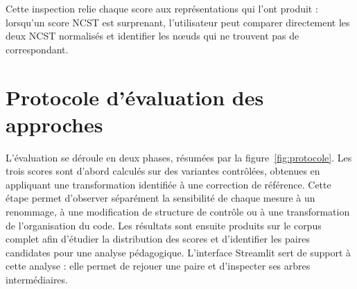 {Cette inspection relie chaque score aux représentations qui l'ont produit :
lorsqu'un score NCST est surprenant, l'utilisateur peut comparer directement
les deux NCST normalisés et identifier les nœuds qui ne trouvent pas de
correspondant.

\section{Protocole d'évaluation des approches}

L'évaluation se déroule en deux phases, résumées par la
figure~\ref{fig:protocole}. Les trois scores sont d'abord calculés sur des
variantes contrôlées, obtenues en appliquant une transformation identifiée à
une correction de référence. Cette étape permet d'observer séparément la
sensibilité de chaque mesure à un renommage, à une modification de structure
de contrôle ou à une transformation de l'organisation du code. Les résultats
sont ensuite produits sur le corpus complet afin d'étudier la distribution des
scores et d'identifier les paires candidates pour une analyse pédagogique.
L'interface Streamlit sert de support à cette analyse : elle permet de
rejouer une paire et d'inspecter ses arbres intermédiaires.

\begin{figure}[htbp]
\centering
{}%
\end{figure}}

